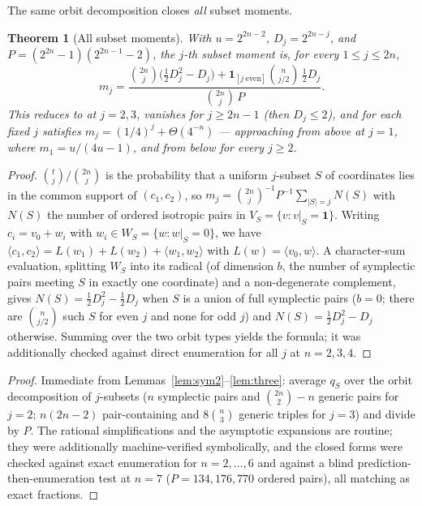 \documentclass[11pt,a4paper]{article}
\theoremstyle{plain}
\newtheorem{theorem}{Theorem}[section]
\theoremstyle{definition}
\begin{document}
The same orbit decomposition closes \emph{all} subset moments.

\begin{theorem}[All subset moments]
\label{thm:mj-general}
With $u=2^{2n-2}$, $D_j=2^{2n-j}$, and $P=(2^{2n}-1)(2^{2n-1}-2)$, the $j$-th subset moment is, for every $1\le j\le 2n$,
\[
m_j = \frac{\binom{2n}{j}\bigl(\tfrac12 D_j^2 - D_j\bigr) + \mathbf 1_{[j\ \mathrm{even}]}\binom{n}{j/2}\,\tfrac12 D_j}{\binom{2n}{j}\,P}.
\]
This reduces to  at $j=2,3$, vanishes for $j\ge 2n-1$ (then $D_j\le 2$), and for each fixed $j$ satisfies $m_j = (1/4)^j + \Theta(4^{-n})$ --- approaching from above at $j=1$, where $m_1=u/(4u-1)$, and from below for every $j\ge 2$.
\end{theorem}

\begin{proof}
$\binom{t}{j}/\binom{2n}{j}$ is the probability that a uniform $j$-subset $S$ of coordinates lies in the common support of $(c_1,c_2)$, so $m_j=\binom{2n}{j}^{-1}P^{-1}\sum_{|S|=j}N(S)$ with $N(S)$ the number of ordered isotropic pairs in $V_S=\{v:v|_S=\mathbf 1\}$. Writing $c_i=v_0+w_i$ with $w_i\in W_S=\{w:w|_S=0\}$, we have $\langle c_1,c_2\rangle=L(w_1)+L(w_2)+\langle w_1,w_2\rangle$ with $L(w)=\langle v_0,w\rangle$. A character-sum evaluation, splitting $W_S$ into its radical (of dimension $b$, the number of symplectic pairs meeting $S$ in exactly one coordinate) and a non-degenerate complement, gives $N(S)=\tfrac12 D_j^2-\tfrac12 D_j$ when $S$ is a union of full symplectic pairs ($b=0$; there are $\binom{n}{j/2}$ such $S$ for even $j$ and none for odd $j$) and $N(S)=\tfrac12 D_j^2-D_j$ otherwise. Summing over the two orbit types yields the formula; it was additionally checked against direct enumeration for all $j$ at $n=2,3,4$.
\end{proof}

\begin{proof}
Immediate from Lemmas~\ref{lem:sym2}--\ref{lem:three}: average $q_S$ over the orbit decomposition of $j$-subsets ($n$ symplectic pairs and $\binom{2n}{2}-n$ generic pairs for $j=2$; $n(2n-2)$ pair-containing and $8\binom{n}{3}$ generic triples for $j=3$) and divide by $P$. The rational simplifications and the asymptotic expansions are routine; they were additionally machine-verified symbolically, and the closed forms were checked against exact enumeration for $n = 2,\dots,6$ and against a blind prediction-then-enumeration test at $n=7$ ($P = 134{,}176{,}770$ ordered pairs), all matching as exact fractions.
\end{proof}
\end{document}
